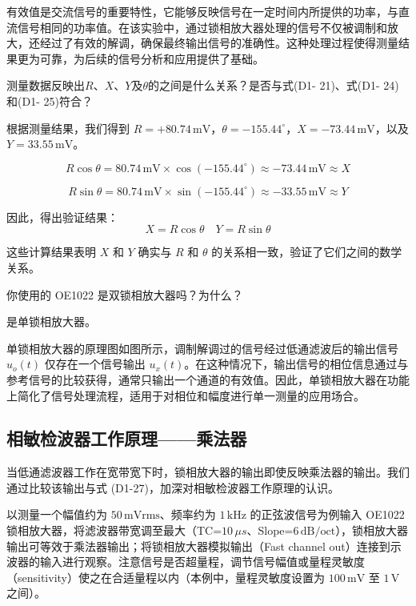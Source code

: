 \documentclass[dvipsnames, svgnames,a4paper,11pt]{article}
\begin{document}
有效值是交流信号的重要特性，它能够反映信号在一定时间内所提供的功率，与直流信号相同的功率值。在该实验中，通过锁相放大器处理的信号不仅被调制和放大，还经过了有效的解调，确保最终输出信号的准确性。这种处理过程使得测量结果更为可靠，为后续的信号分析和应用提供了基础。
\begin{question}
	测量数据反映出$R$、$X$、$Y$及$\theta$的之间是什么关系？是否与式(D1- 21)、式(D1- 24)和(D1- 25)符合？
\end{question}
根据测量结果，我们得到 \( R = +80.74 \, \text{mV} \)，\( \theta = -155.44^\circ \)，\( X = -73.44 \, \text{mV} \)，以及 \( Y = 33.55 \, \text{mV} \)。


\[
R \cos \theta = 80.74 \, \text{mV} \times \cos(-155.44^\circ) \approx -73.44 \, \text{mV} \approx X
\]


\[
R \sin \theta = 80.74 \, \text{mV} \times \sin(-155.44^\circ) \approx -33.55 \, \text{mV} \approx Y
\]

因此，得出验证结果：
\[
X = R \cos \theta \quad Y = R \sin \theta
\]

这些计算结果表明 \( X \) 和 \( Y \) 确实与 \( R \) 和 \( \theta \) 的关系相一致，验证了它们之间的数学关系。

\begin{question}
	你使用的 OE1022 是双锁相放大器吗？为什么？
\end{question}
是单锁相放大器。

单锁相放大器的原理图如图所示，调制解调过的信号经过低通滤波后的输出信号 \( u_o(t) \) 仅存在一个信号输出 \( u_x(t) \)。在这种情况下，输出信号的相位信息通过与参考信号的比较获得，通常只输出一个通道的有效值。因此，单锁相放大器在功能上简化了信号处理流程，适用于对相位和幅度进行单一测量的应用场合。

\subsection{相敏检波器工作原理——乘法器}

当低通滤波器工作在宽带宽下时，锁相放大器的输出即使反映乘法器的输出。我们通过比较该输出与式 (D1-27)，加深对相敏检波器工作原理的认识。

以测量一个幅值约为 $50 \, \text{mVrms}$、频率约为 $1 \, \text{kHz}$ 的正弦波信号为例输入 OE1022 锁相放大器，将滤波器带宽调至最大（TC=$10 \, \mu s$、Slope=$6 \, \text{dB/oct}$），锁相放大器输出可等效于乘法器输出；将锁相放大器模拟输出（Fast channel out）连接到示波器的输入进行观察。注意信号是否超量程，调节信号幅值或量程灵敏度（sensitivity）使之在合适量程以内（本例中，量程灵敏度设置为 $100 \, \text{mV}$ 至 $1 \, \text{V}$ 之间）。
\end{document}
